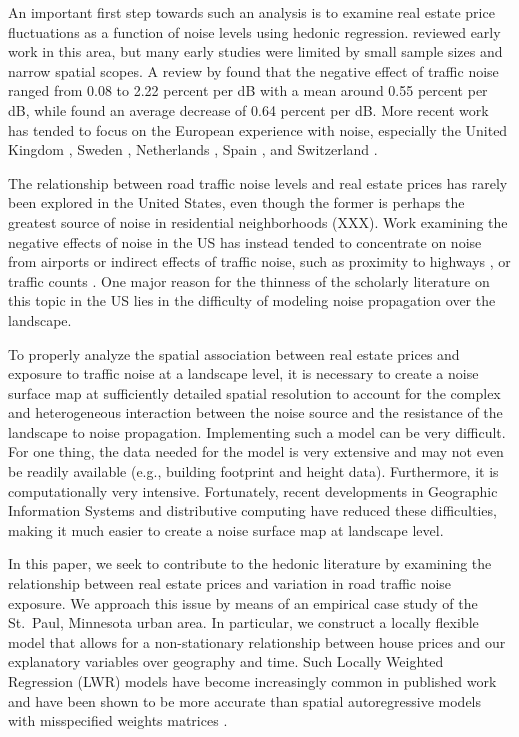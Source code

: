 \documentclass{article}\usepackage{graphicx, color}
\begin{document}
An important first step towards such an analysis is to examine real estate price fluctuations as a function of noise levels using hedonic regression. \citet{Nelson1982} reviewed early work in this area, but many early studies were limited by small sample sizes and narrow spatial scopes. A review by \citet{Bateman2001} found that the negative effect of traffic noise ranged from 0.08 to 2.22 percent per dB with a mean around 0.55 percent per dB, while \citet{Navrud2002} found an average decrease of 0.64 percent per dB. More recent work has tended to focus on the European experience with noise, especially the United Kingdom \citep{Day2007, Blanco2011}, Sweden \citep{Wilhelmsson2000, Andersson2010}, Netherlands \citep{Theebe2004a}, Spain \citep{MarmolejoDuarteCarlos;GonzalezTamez2009}, and Switzerland \citep{Baranzini2010}. 

The relationship between road traffic noise levels and real estate prices has rarely been explored in the United States, even though the former is perhaps the greatest source of noise in residential neighborhoods (XXX). Work examining the negative effects of noise in the US has instead tended to concentrate on noise from airports \citep{Espey2000, McMillen2004, Cohen2008a} or indirect effects of traffic noise, such as proximity to highways \citep{Matthews2007, Chernobai2009, Li2012}, or traffic counts \citep{HughesJr.1992, Larsen2012}.  One major reason for the thinness of the scholarly literature on this topic in the US lies in the difficulty of modeling noise propagation over the landscape.  

To properly analyze the spatial association between real estate prices and exposure to traffic noise at a landscape level, it is necessary to create a noise surface map at sufficiently detailed spatial resolution to account for the complex and heterogeneous interaction between the noise source and the resistance of the landscape to noise propagation.  Implementing such a model can be very difficult.  For one thing, the data needed for the model is very extensive and may not even be readily available (e.g., building footprint and height data).  Furthermore, it is computationally very intensive. Fortunately, recent developments in Geographic Information Systems and distributive computing have reduced these difficulties, making it much easier to create a noise surface map at landscape level.  

In this paper, we seek to contribute to the hedonic literature by examining the relationship between real estate prices and variation in road traffic noise exposure.  We approach this issue by means of an empirical case study of the St.\ Paul, Minnesota urban area.  In particular, we construct a locally flexible model that allows for a non-stationary relationship between house prices and our explanatory variables over geography and time. Such Locally Weighted Regression (LWR) models have become increasingly common in published work \citep[see][]{MarmolejoDuarteCarlos;GonzalezTamez2009, Carruthers2010, Sunding2010, Nappi-Choulet2011} and have been shown to be more accurate than spatial autoregressive models with misspecified weights matrices \citep{McMillen2012}.
\end{document}
